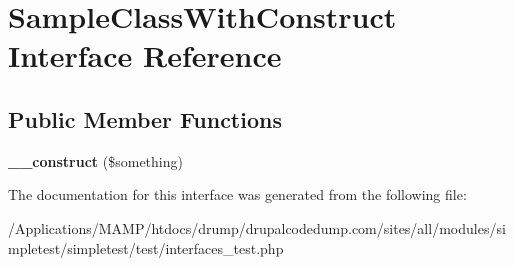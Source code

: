 \hypertarget{interface_sample_class_with_construct}{
\section{SampleClassWithConstruct Interface Reference}
\label{interface_sample_class_with_construct}
}
\subsection*{Public Member Functions}
\begin{DoxyCompactItemize}
\item 
\hypertarget{interface_sample_class_with_construct_ae26811dd3b662203f98ec29af3be16ce}{
{\bfseries \_\-\_\-construct} (\$something)}
\label{interface_sample_class_with_construct_ae26811dd3b662203f98ec29af3be16ce}

\end{DoxyCompactItemize}


The documentation for this interface was generated from the following file:\begin{DoxyCompactItemize}
\item 
/Applications/MAMP/htdocs/drump/drupalcodedump.com/sites/all/modules/simpletest/simpletest/test/interfaces\_\-test.php\end{DoxyCompactItemize}
